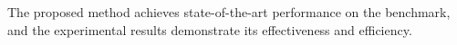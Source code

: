 The proposed method achieves state-of-the-art performance on the benchmark, and the experimental results demonstrate its effectiveness and efficiency.
